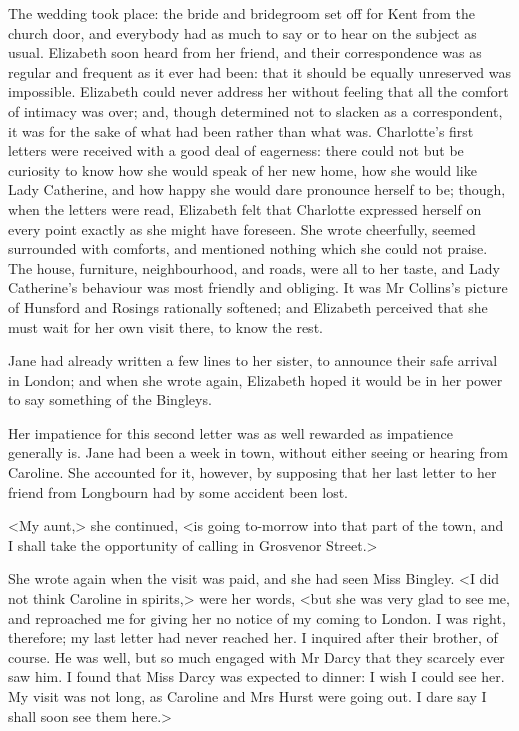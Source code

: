The wedding took place: the bride and bridegroom set off for Kent from the church door, and everybody had as much to say or to hear on the subject as usual. Elizabeth soon heard from her friend, and their correspondence was as regular and frequent as it ever had been: that it should be equally unreserved was impossible. Elizabeth could never address her without feeling that all the comfort of intimacy was over; and, though determined not to slacken as a correspondent, it was for the sake of what had been rather than what was. Charlotte's first letters were received with a good deal of eagerness: there could not but be curiosity to know how she would speak of her new home, how she would like Lady Catherine, and how happy she would dare pronounce herself to be; though, when the letters were read, Elizabeth felt that Charlotte expressed herself on every point exactly as she might have foreseen. She wrote cheerfully, seemed surrounded with comforts, and mentioned nothing which she could not praise. The house, furniture, neighbourhood, and roads, were all to her taste, and Lady Catherine's behaviour was most friendly and obliging. It was Mr Collins's picture of Hunsford and Rosings rationally softened; and Elizabeth perceived that she must wait for her own visit there, to know the rest.

Jane had already written a few lines to her sister, to announce their safe arrival in London; and when she wrote again, Elizabeth hoped it would be in her power to say something of the Bingleys.

Her impatience for this second letter was as well rewarded as impatience generally is. Jane had been a week in town, without either seeing or hearing from Caroline. She accounted for it, however, by supposing that her last letter to her friend from Longbourn had by some accident been lost.

<My aunt,> she continued, <is going to-morrow into that part of the town, and I shall take the opportunity of calling in Grosvenor Street.>

She wrote again when the visit was paid, and she had seen Miss Bingley. <I did not think Caroline in spirits,> were her words, <but she was very glad to see me, and reproached me for giving her no notice of my coming to London. I was right, therefore; my last letter had never reached her. I inquired after their brother, of course. He was well, but so much engaged with Mr Darcy that they scarcely ever saw him. I found that Miss Darcy was expected to dinner: I wish I could see her. My visit was not long, as Caroline and Mrs Hurst were going out. I dare say I shall soon see them here.>

